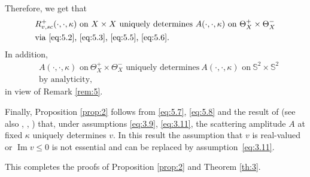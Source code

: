 \documentclass[10pt,a4paper]{amsart}
\renewcommand{\Im}{\mathop{\mathrm{Im}}}
\theoremstyle{definition}
\begin{document}
Therefore, we get that\vspace*{-3pt}
\begin{equation}\label{eq:5.7}
\begin{aligned}
&R_{v,sc}^+(\cdot, \cdot, \kappa)\text{ on}\ X\times X\text{ uniquely determines}\ A(\cdot, \cdot, \kappa)\text{ on}\ \Theta_X^+ \times \Theta_X^-\\
&\text{via \eqref{eq:5.2}, \eqref{eq:5.3}, \eqref{eq:5.5}, \eqref{eq:5.6}.}
\end{aligned}
\end{equation}
In addition,\vspace*{-3pt}
\begin{equation}\label{eq:5.8}
\begin{aligned}
&A(\cdot, \cdot, \kappa)\text{ on}\ \Theta_X^+ \times \Theta_X^-\text{ uniquely determines}\ A(\cdot, \cdot, \kappa)\text{ on}\ \mathbb S^2 \times \mathbb S^2 \\
&\text{by analyticity},
\end{aligned}
\end{equation}
in view of Remark \ref{rem:5}.

Finally, Proposition \ref{prop:2} follows from \eqref{eq:5.7}, \eqref{eq:5.8} and the result of \cite{N1988} (see also \cite{N1994}, \cite{HH}, \cite{E}) that,
under assumptions \eqref{eq:3.9}, \eqref{eq:3.11}, the scattering amplitude $A$ at fixed $\kappa$ uniquely determines $v$.
In this result the assumption that $v$ is real-valued or $\Im v \leq 0$ is not essential and can be replaced by assumption~\eqref{eq:3.11}.

This completes the proofs of Proposition \ref{prop:2} and Theorem \ref{th:3}.
\end{document}
